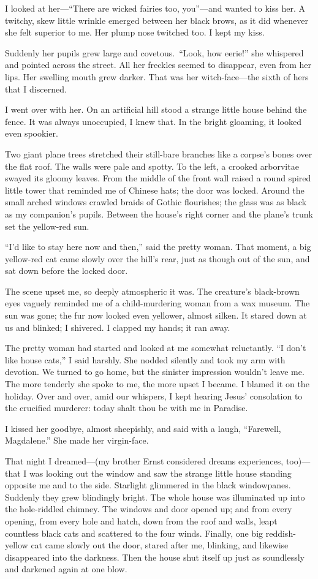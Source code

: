 \documentclass[12pt,a4paper]{article}
\begin{document}
I looked at her—“There are wicked fairies too, you”—and wanted to kiss her. A twitchy, skew little wrinkle emerged between her black brows, as it did whenever she felt superior to me. Her plump nose twitched too. I kept my kiss.

Suddenly her pupils grew large and covetous. “Look, how eerie!” she whispered and pointed across the street. All her freckles seemed to disappear, even from her lips. Her swelling mouth grew darker. That was her witch-face—the sixth of hers that I discerned.

I went over with her. On an artificial hill stood a strange little house behind the fence. It was always unoccupied, I knew that. In the bright gloaming, it looked even spookier.

Two giant plane trees stretched their still-bare branches like a corpse’s bones over the flat roof. The walls were pale and spotty. To the left, a crooked arborvitae swayed its gloomy leaves. From the middle of the front wall raised a round spired little tower that reminded me of Chinese hats; the door was locked. Around the small arched windows crawled braids of Gothic flourishes; the glass was as black as my companion’s pupils. Between the house’s right corner and the plane’s trunk set the yellow-red sun.

“I’d like to stay here now and then,” said the pretty woman. That moment, a big yellow-red cat came slowly over the hill’s rear, just as though out of the sun, and sat down before the locked door.

The scene upset me, so deeply atmospheric it was. The creature’s black-brown eyes vaguely reminded me of a child-murdering woman from a wax museum. The sun was gone; the fur now looked even yellower, almost silken. It stared down at us and blinked; I shivered. I clapped my hands; it ran away. 

The pretty woman had started and looked at me somewhat reluctantly. “I don’t like house cats,” I said harshly. She nodded silently and took my arm with devotion. We turned to go home, but the sinister impression wouldn’t leave me. The more tenderly she spoke to me, the more upset I became. I blamed it on the holiday. Over and over, amid our whispers, I kept hearing Jesus’ consolation to the crucified murderer: today shalt thou be with me in Paradise.

I kissed her goodbye, almost sheepishly, and said with a laugh, “Farewell, Magdalene.” She made her virgin-face.

That night I dreamed—(my brother Ernst considered dreams experiences, too)—that I was looking out the window and saw the strange little house standing opposite me and to the side. Starlight glimmered in the black windowpanes. Suddenly they grew blindingly bright. The whole house was illuminated up into the hole-riddled chimney. The windows and door opened up; and from every opening, from every hole and hatch, down from the roof and walls, leapt countless black cats and scattered to the four winds. Finally, one big reddish-yellow cat came slowly out the door, stared after me, blinking, and likewise disappeared into the darkness. Then the house shut itself up just as soundlessly and darkened again at one blow.
\end{document}
